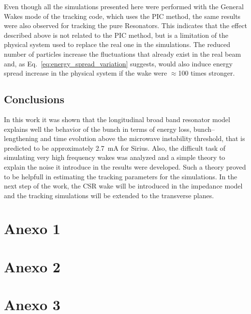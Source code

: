 \begin{apendicesenv}
    Even though all the simulations presented here were performed with the General Wakes mode of the tracking code, which uses the PIC method, the same results were also observed for tracking the pure Resonators. This indicates that the effect described above is not related to the PIC method, but is a limitation of the physical system used to replace the real one in the simulations. The reduced number of particles increase the fluctuations that already exist in the real beam and, as Eq.~\eqref{eq:energy_spread_variation} suggests, would also induce energy spread increase in the physical system if the wake were $\approx$100 times stronger.

\section{Conclusions}

    In this work it was shown that the longitudinal broad band resonator model explains well the behavior of the bunch in terms of energy loss, bunch--lengthening and time evolution above the microwave instability threshold, that is predicted to be approximately 2.7~mA for Sirius. Also, the difficult task of simulating very high frequency wakes was analyzed and a simple theory to explain the noise it introduce in the results were developed. Such a theory proved to be helpfull in estimating the tracking parameters for the simulations. In the next step of the work, the CSR wake will be introduced in the impedance model and the tracking simulations will be extended to the transverse planes.

\end{apendicesenv}


\begin{anexosenv}
\partanexos
\chapter{Anexo 1}
    \lipsum[30]
\chapter{Anexo 2}
    \lipsum[31]
\chapter{Anexo 3}
    \lipsum[32]
\end{anexosenv}


\printindex

\printglossaries


